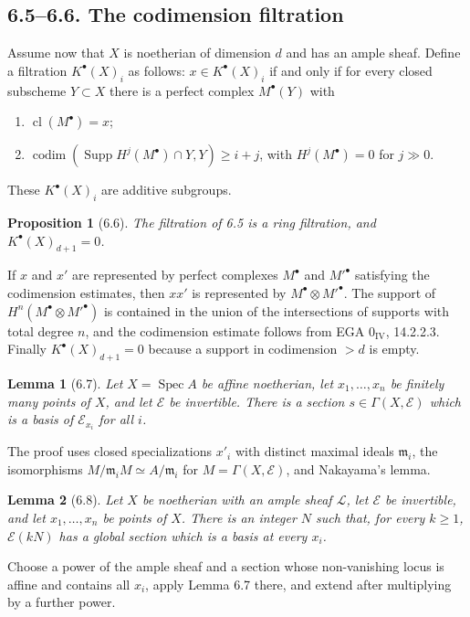 \documentclass[13pt]{extarticle}
\newcommand{\Spec}{\operatorname{Spec}}
\newcommand{\Supp}{\operatorname{Supp}}
\newcommand{\codim}{\operatorname{codim}}
\newcommand{\cl}{\operatorname{cl}}
\newtheorem*{proposition}{Proposition}
\newtheorem*{lemma}{Lemma}
\begin{document}
\subsection*{6.5--6.6. The codimension filtration}
Assume now that $X$ is noetherian of dimension $d$ and has an ample sheaf. Define a filtration $K^{\bullet}(X)_i$ as follows: $x\in K^{\bullet}(X)_i$ if and only if for every closed subscheme $Y\subset X$ there is a perfect complex $M^{\bullet}(Y)$ with
\begin{enumerate}[label=(\alph*)]
\item $\cl(M^{\bullet})=x$;
\item $\codim(\Supp H^j(M^{\bullet})\cap Y,Y)\geq i+j$, with $H^j(M^{\bullet})=0$ for $j\gg 0$.
\end{enumerate}
These $K^{\bullet}(X)_i$ are additive subgroups.

\begin{proposition}[6.6]
The filtration of 6.5 is a ring filtration, and $K^{\bullet}(X)_{d+1}=0$.
\end{proposition}

If $x$ and $x'$ are represented by perfect complexes $M^{\bullet}$ and $M'^{\bullet}$ satisfying the codimension estimates, then $xx'$ is represented by $M^{\bullet}\otimes M'^{\bullet}$. The support of $H^n(M^{\bullet}\otimes M'^{\bullet})$ is contained in the union of the intersections of supports with total degree $n$, and the codimension estimate follows from EGA $0_{\mathrm{IV}}$, 14.2.2.3. Finally $K^{\bullet}(X)_{d+1}=0$ because a support in codimension $>d$ is empty.

\begin{lemma}[6.7]
Let $X=\Spec A$ be affine noetherian, let $x_1,\ldots,x_n$ be finitely many points of $X$, and let $\mathcal E$ be invertible. There is a section $s\in\Gamma(X,\mathcal E)$ which is a basis of $\mathcal E_{x_i}$ for all $i$.
\end{lemma}
The proof uses closed specializations $x'_i$ with distinct maximal ideals $\mathfrak m_i$, the isomorphisms $M/\mathfrak m_iM\simeq A/\mathfrak m_i$ for $M=\Gamma(X,\mathcal E)$, and Nakayama's lemma.

\begin{lemma}[6.8]
Let $X$ be noetherian with an ample sheaf $\mathcal L$, let $\mathcal E$ be invertible, and let $x_1,\ldots,x_n$ be points of $X$. There is an integer $N$ such that, for every $k\geq 1$, $\mathcal E(kN)$ has a global section which is a basis at every $x_i$.
\end{lemma}
Choose a power of the ample sheaf and a section whose non-vanishing locus is affine and contains all $x_i$, apply Lemma 6.7 there, and extend after multiplying by a further power.
\end{document}
